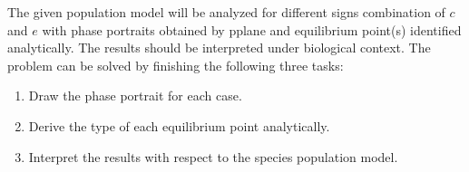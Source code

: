 The given population model will be analyzed for different signs combination of $c$ and $e$ with phase portraits obtained by pplane and equilibrium point(s) identified analytically. The results should be interpreted under biological context. The problem can be solved by finishing the following three tasks:
\begin{enumerate}
\item Draw the phase portrait for each case.
\item Derive the type of each equilibrium point analytically.
\item Interpret the results with respect to the species population model. 
\end{enumerate}